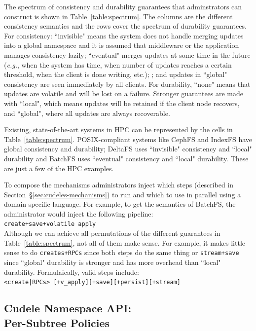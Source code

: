 The spectrum of consistency and durability guarantees that adminstrators can
construct is shown in Table~\ref{table:spectrum}. The columns are the different
consistency semantics and the rows cover the spectrum of durability guarantees.
For consistency: ``invisible" means the system does not handle merging updates
into a global namespace and it is assumed that middleware or the application
manages consistency lazily; ``eventual" merges updates at some time in the
future ({\it e.g.}, when the system has time, when number of updates reaches a
certain threshold, when the client is done writing, etc.); ; and updates in
``global" consistency are seen immediately by all clients. For durability,
``none" means that updates are volatile and will be lost on a failure. Stronger
guarantees are made with ``local", which means updates will be retained if the
client node recovers, and ``global", where all updates are always recoverable.

Existing, state-of-the-art systems in HPC can be represented by the cells in
Table~\ref{table:spectrum}.  POSIX-compliant systems like CephFS and IndexFS
have global consistency and durability; DeltaFS uses ``invisible" consistency
and ``local" durability and BatchFS uses ``eventual" consistency and ``local"
durability. These are just a few of the HPC examples.  

To compose the mechanisms administrators inject which steps (described in
Section~\S\ref{sec:cudeles-mechanisms}) to run and which to use in parallel
using a domain specific language. For example, to get the semantics of BatchFS,
the administrator would inject the following pipeline:\\

\noindent \texttt{create+save+volatile apply}\\

Although we can achieve all permutations of the different guarantees in
Table~\ref{table:spectrum}, not all of them make sense. For example, it
makes little sense to do \texttt{creates+RPCs} since both steps do the same
thing or \texttt{stream+save} since ``global" durability is stronger and has
more overhead than ``local" durability.  Formulaically, valid steps
include:\\

\noindent \texttt{<create|RPCs> [+v\_apply][+save][+persist][+stream]}

\subsection{Cudele Namespace API:\\Per-Subtree Policies}
\label{sec:cudele-namespace-api-per-subtree-policies}

